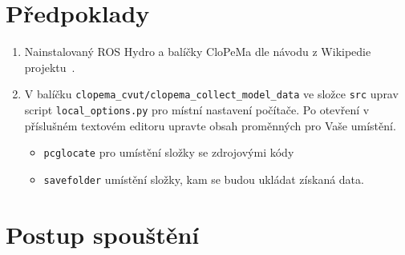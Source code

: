 \documentclass[10pt,a4paper,titlepage,oneside]{report}
\newcommand{\red}[1]{\textbf{\rlap{\color{red}#1}}}
\begin{document}
\section{Předpoklady}
\label{sec:prd}
\begin{enumerate}

   \item Nainstalovaný ROS Hydro a balíčky CloPeMa dle návodu z Wikipedie projektu~\cite{wikiPack}.
%  
  
  
  \item V balíčku \verb|clopema_cvut/clopema_collect_model_data| ve složce \verb|src| uprav script \verb|local_options.py| pro místní nastavení počítače. Po otevření v příslušném textovém editoru upravte obsah proměnných pro Vaše umístění. 
  \begin{itemize}
  	\item \verb|pcglocate| pro umístění složky se zdrojovými kódy
  	\item \verb|savefolder| umístění složky, kam se budou ukládat získaná data.
  \end{itemize}
\end{enumerate}


\section{Postup spouštění}
\label{sec:runScript}
\end{document}
